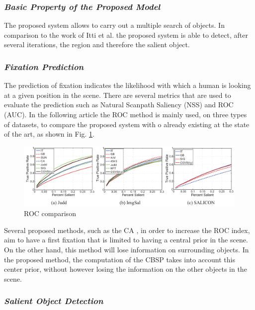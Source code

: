\subsubsection{\emph{Basic Property of the Proposed Model}}
The proposed system allows to carry out a multiple search of objects. In 
comparison to the work of Itti et al. \cite{0747815505} the proposed system is able to detect, 
after several iterations, the region and therefore the salient object.

\subsubsection{\emph{Fixation Prediction}}
The prediction of fixation indicates the likelihood with which a human is 
looking at a given position in the scene. There are several metrics that are 
used to evaluate the prediction such as Natural Scanpath Saliency (NSS) 
and ROC (AUC). In the following article the ROC method is mainly used, 
on three types of datasets, to compare the proposed system with o already 
existing at the state of the art, as shown in Fig. \ref{fig: ROC}.
\begin{figure}[htbp]
    \centering
    \includegraphics[width = 1 \linewidth]{images/ROC.png}
    \centering
    \caption{ROC comparison}
    \label{fig: ROC}
\end{figure}

Several proposed methods, such as the CA \cite{0747815502}, in order to increase the ROC 
index, aim to have a first fixation that is limited to having a central prior 
in the scene. On the other hand, this method will lose information on surrounding 
objects. In the proposed method, the computation of the CBSP 
takes into account this center prior, without however losing the information 
on the other objects in the scene.

\subsubsection{\emph{Salient Object Detection}}


